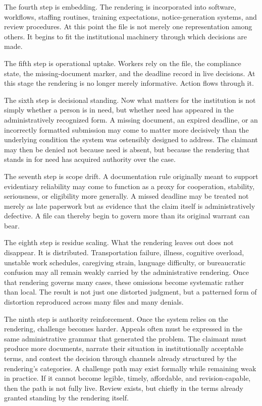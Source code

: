\documentclass[11pt]{article}
\begin{document}
The fourth step is embedding. The rendering is incorporated into software, workflows, staffing routines, training expectations, notice-generation systems, and review procedures. At this point the file is not merely one representation among others. It begins to fit the institutional machinery through which decisions are made.

The fifth step is operational uptake. Workers rely on the file, the compliance state, the missing-document marker, and the deadline record in live decisions. At this stage the rendering is no longer merely informative. Action flows through it.\cite{Lipsky1980StreetLevelBureaucracy}

The sixth step is decisional standing. Now what matters for the institution is not simply whether a person is in need, but whether need has appeared in the administratively recognized form. A missing document, an expired deadline, or an incorrectly formatted submission may come to matter more decisively than the underlying condition the system was ostensibly designed to address. The claimant may then be denied not because need is absent, but because the rendering that stands in for need has acquired authority over the case.

The seventh step is scope drift. A documentation rule originally meant to support evidentiary reliability may come to function as a proxy for cooperation, stability, seriousness, or eligibility more generally. A missed deadline may be treated not merely as late paperwork but as evidence that the claim itself is administratively defective. A file can thereby begin to govern more than its original warrant can bear.\cite{Scott1998SeeingLikeState}

The eighth step is residue scaling. What the rendering leaves out does not disappear. It is distributed. Transportation failure, illness, cognitive overload, unstable work schedules, caregiving strain, language difficulty, or bureaucratic confusion may all remain weakly carried by the administrative rendering. Once that rendering governs many cases, these omissions become systematic rather than local. The result is not just one distorted judgment, but a patterned form of distortion reproduced across many files and many denials.\cite{MoynihanHerdHarvey2015AdministrativeBurden,Eubanks2018AutomatingInequality}

The ninth step is authority reinforcement. Once the system relies on the rendering, challenge becomes harder. Appeals often must be expressed in the same administrative grammar that generated the problem. The claimant must produce more documents, narrate their situation in institutionally acceptable terms, and contest the decision through channels already structured by the rendering's categories. A challenge path may exist formally while remaining weak in practice. If it cannot become legible, timely, affordable, and revision-capable, then the path is not fully live. Review exists, but chiefly in the terms already granted standing by the rendering itself.\cite{MoynihanHerdHarvey2015AdministrativeBurden,Eubanks2018AutomatingInequality}
\end{document}
